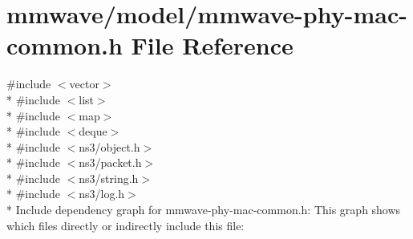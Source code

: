 \hypertarget{mmwave-phy-mac-common_8h}{}\section{mmwave/model/mmwave-\/phy-\/mac-\/common.h File Reference}
\label{mmwave-phy-mac-common_8h}
{\ttfamily \#include $<$vector$>$}\\*
{\ttfamily \#include $<$list$>$}\\*
{\ttfamily \#include $<$map$>$}\\*
{\ttfamily \#include $<$deque$>$}\\*
{\ttfamily \#include $<$ns3/object.\+h$>$}\\*
{\ttfamily \#include $<$ns3/packet.\+h$>$}\\*
{\ttfamily \#include $<$ns3/string.\+h$>$}\\*
{\ttfamily \#include $<$ns3/log.\+h$>$}\\*
Include dependency graph for mmwave-\/phy-\/mac-\/common.h\+:
This graph shows which files directly or indirectly include this file\+:
